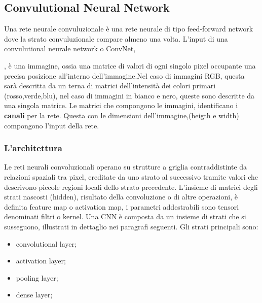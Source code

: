 \documentclass[14pt]{extarticle}
\begin{document}
\subsection{Convulutional Neural Network}
Una rete neurale convuluzionale è una rete neurale di tipo feed-forward network dove la strato convuluzionale compare almeno una volta.
L'input di una convulutional neurale network o ConvNet, , è una immagine, ossia una matrice di valori di ogni singolo pixel occupante una precisa posizione all'interno dell'immagine.Nel caso di immagini RGB, questa sarà descritta da un terna di matrici dell'intensità dei colori primari (rosso,verde,blu), nel caso di immagini in bianco e nero, queste sono descritte da una singola matrice. Le matrici che compongono le immagini, identificano i \textbf{canali} per la rete. Questa con le dimensioni dell'immagine,(heigth e width) compongono l'input della rete.
\subsubsection{L'architettura} 
Le reti neurali convoluzionali operano su strutture a griglia contraddistinte da relazioni spaziali tra pixel, ereditate da uno strato al successivo tramite valori che descrivono
piccole regioni locali dello strato precedente. L’insieme di matrici degli strati nascosti (hidden), risultato della convoluzione o di altre operazioni, è definita feature map o activation map, i parametri addestrabili sono tensori denominati filtri o kernel.
Una CNN è composta da  un insieme di strati che si susseguono, illustrati in dettaglio nei paragrafi seguenti. Gli strati principali sono:
\begin{itemize}
\item convolutional layer;
\item activation layer;
\item pooling layer;
\item dense layer;
\end{itemize}
\cite{torresin2019sviluppo}
\end{document}
